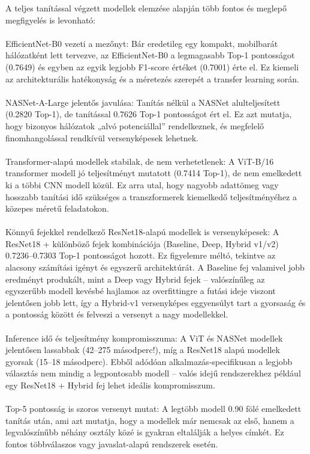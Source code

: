 	A teljes tanítással végzett modellek elemzése alapján több fontos és meglepő megfigyelés is levonható:
	\\\\
    EfficientNet-B0 vezeti a mezőnyt: Bár eredetileg egy kompakt, mobilbarát hálózatként lett tervezve, az EfficientNet-B0 a legmagasabb Top-1 pontosságot (0.7649) és egyben az egyik legjobb F1-score értéket (0.7001) érte el. Ez kiemeli az architekturális hatékonyság és a méretezés szerepét a transfer learning során.
	\\\\
    NASNet-A-Large jelentős javulása: Tanítás nélkül a NASNet alulteljesített (0.2820 Top-1), de tanítással 0.7626 Top-1 pontosságot ért el. Ez azt mutatja, hogy bizonyos hálózatok „alvó potenciállal” rendelkeznek, és megfelelő finomhangolással rendkívül versenyképesek lehetnek.
	\\\\
    Transformer-alapú modellek stabilak, de nem verhetetlenek: A ViT-B/16 transformer modell jó teljesítményt mutatott (0.7414 Top-1), de nem emelkedett ki a többi CNN modell közül. Ez arra utal, hogy nagyobb adattömeg vagy hosszabb tanítási idő szükséges a transzformerek kiemelkedő teljesítményéhez a közepes méretű feladatokon.
	\\\\
    Könnyű fejekkel rendelkező ResNet18-alapú modellek is versenyképesek: A ResNet18 + különböző fejek kombinációja (Baseline, Deep, Hybrid v1/v2) 0.7236–0.7303 Top-1 pontosságot hozott. Ez figyelemre méltó, tekintve az alacsony számítási igényt és egyszerű architektúrát. A Baseline fej valamivel jobb eredményt produkált, mint a Deep vagy Hybrid fejek – valószínűleg az egyszerűbb modell kevésbé hajlamos az overfittingre a futási ideje viszont jelentősen jobb lett, így a Hybrid-v1 versenyképes eggyensúlyt tart a gyorsaság és a pontosság között és felveszi a versenyt a nagy modellekkel.
	\\\\
    Inference idő és teljesítmény kompromisszuma: A ViT és NASNet modellek jelentősen lassabbak (42–275 másodperc!), míg a ResNet18 alapú modellek gyorsak (15–18 másodperc). Ebből adódóan alkalmazás-specifikusan a legjobb választás nem mindig a legpontosabb modell – valós idejű rendszerekhez például egy ResNet18 + Hybrid fej lehet ideális kompromisszum.
	\\\\
    Top-5 pontosság is szoros versenyt mutat: A legtöbb modell 0.90 fölé emelkedett tanítás után, ami azt mutatja, hogy a modellek már nemcsak az első, hanem a legvalószínűbb néhány osztály közé is gyakran eltalálják a helyes címkét. Ez fontos többválaszos vagy javaslat-alapú rendszerek esetén.

